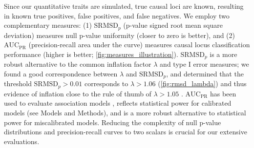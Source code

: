 \documentclass[11pt]{article}
\newcommand{\rmsd}{\text{SRMSD}_p}
\newcommand{\auc}{\text{AUC}_\text{PR}}
\begin{document}
Since our quantitative traits are simulated, true causal loci are known, resulting in known true positives, false positives, and false negatives.
We employ two complementary measures:
(1) $\rmsd$ (p-value signed root mean square deviation) measures null p-value uniformity (closer to zero is better), and
(2) $\auc$ (precision-recall area under the curve) measures causal locus classification performance (higher is better; \cref{fig:measures_illustration}).
$\rmsd$ is a more robust alternative to the common inflation factor $\lambda$ and type I error measures; we found a good correspondence between $\lambda$ and $\rmsd$, and determined that the threshold $\rmsd > 0.01$ corresponds to $\lambda > 1.06$ (\cref{fig:rmsd_lambda}) and thus evidence of inflation close to the rule of thumb of $\lambda > 1.05$ \citep{price_new_2010}.
$\auc$ has been used to evaluate association models \citep{rakitsch_lasso_2013}, reflects statistical power for calibrated models (see Models and Methods), and is a more robust alternative to statistical power for miscalibrated models.
Reducing the complexity of null p-value distributions and precision-recall curves to two scalars is crucial for our extensive evaluations.
\end{document}
